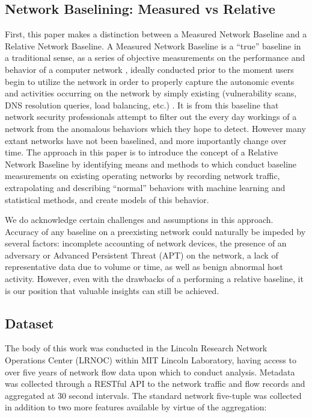 \subsection{Network Baselining: Measured vs Relative}
First, this paper makes a distinction between a Measured Network Baseline and a Relative Network Baseline.  A Measured Network Baseline is a ``true'' baseline in a traditional sense, as a series of objective measurements on the performance and behavior of a computer network \cite{cisco_2017}, ideally conducted prior to the moment users begin to utilize the network in order to properly capture the autonomic events and activities occurring on the network by simply existing (vulnerability scans, DNS resolution queries, load balancing, etc.) \cite{1212675}. It is from this baseline that network security professionals attempt to filter out the every day workings of a network from the anomalous behaviors which they hope to detect. However many extant networks have not been baselined, and more importantly change over time. The approach in this paper is to introduce the concept of a Relative Network Baseline by identifying means and methods to which conduct baseline measurements on existing operating networks by recording network traffic, extrapolating and describing ``normal'' behaviors with machine learning and statistical methods, and create models of this behavior.

We do acknowledge certain challenges and assumptions in this approach. Accuracy of any baseline on a preexisting network could naturally be impeded by several factors: incomplete accounting of network devices, the presence of an adversary or Advanced Persistent Threat (APT) on the network, a lack of representative data due to volume or time, as well as benign abnormal host activity.  However, even with the drawbacks of a performing a relative baseline, it is our position that valuable insights can still be achieved.

\subsection{Dataset}
The body of this work was conducted in the Lincoln Research Network Operations Center (LRNOC) within MIT Lincoln Laboratory, having access to over five years of network flow data upon which to conduct analysis. Metadata was collected through a RESTful API to the network traffic and flow records and aggregated at 30 second intervals. The standard network five-tuple was collected in addition to two more features available by virtue of the aggregation:

